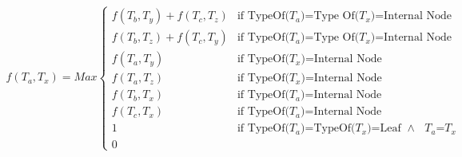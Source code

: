 \begin{equation*}
\begin{aligned}
f(T_a,T_x)=Max
\begin{cases}
f(T_b,T_y)+f(T_c,T_z) & \text{if TypeOf($T_a$)=Type Of($T_x$)=Internal Node}
\\
f(T_b,T_z)+f(T_c,T_y) &  \text{if TypeOf($T_a$)=Type Of($T_x$)=Internal Node}
\\
f(T_a, T_y)           & \text{if TypeOf($T_x$)=Internal Node}
\\
f(T_a, T_z)           & \text{if TypeOf($T_x$)=Internal Node}
\\
f(T_b, T_x)           & \text{if TypeOf($T_a$)=Internal Node}
\\
f(T_c, T_x)           & \text{if TypeOf($T_a$)=Internal Node}
\\
1 	                  & \text{if TypeOf($T_a$)=TypeOf($T_x$)=Leaf  $\land$  $T_a$=$T_x$}
\\
0                     
\end{cases}
\end{aligned}
\phantom{\hspace{6cm}}
\end{equation*}



\todo{\dots}